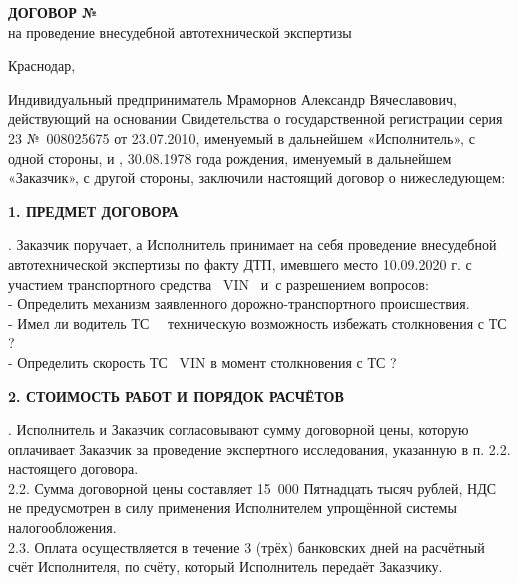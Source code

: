 \begin{center}
    	\textbf{{\large  ДОГОВОР № \NomerDoc}}\\
    	 на проведение внесудебной автотехнической экспертизы 
    	 \vspace{-3mm}
    \end{center}
\vspace{-6mm}
\begin{flushright}
		\hfill	Краснодар, \dog    \\[8mm]
\end{flushright} 
\vspace{-6mm}
Индивидуальный предприниматель Мраморнов Александр Вячеславович, действующий на основании Свидетельства о государственной регистрации серия 23 №~008025675 от 23.07.2010, именуемый в дальнейшем «Исполнитель», с одной стороны, и , 30.08.1978 года рождения, именуемый в дальнейшем «Заказчик», с другой стороны, заключили настоящий договор о нижеследующем:

         
\begin{center}
	\textbf{1. ПРЕДМЕТ ДОГОВОРА}
\end{center}
\vspace{-3mm}
 . Заказчик поручает, а Исполнитель принимает на себя проведение внесудебной автотехнической экспертизы по факту ДТП, имевшего место 10.09.2020 г. с участием  транспортного средства  \, VIN \vin\, и  \,с разрешением вопросов:\\
 - Определить механизм заявленного дорожно-транспортного происшествия.\\
 - Имел ли водитель ТС \,   \, техническую возможность избежать столкновения с ТС ?\\ 
- Определить скорость ТС  \, VIN \vin в момент столкновения с ТС ?


\begin{center}
	\textbf{2. СТОИМОСТЬ РАБОТ И ПОРЯДОК РАСЧЁТОВ}
\end{center}
\vspace{-3mm}
 . Исполнитель и Заказчик согласовывают сумму договорной цены, которую оплачивает Заказчик   за проведение экспертного исследования, указанную в п. 2.2. настоящего договора.\\ 
2.2. Сумма договорной цены составляет  15~000 {Пятнадцать тысяч} рублей, НДС не предусмотрен в силу применения Исполнителем упрощённой системы налогообложения.\\
2.3. Оплата осуществляется в течение 3 (трёх) банковских дней на расчётный счёт Исполнителя, по счёту, который Исполнитель передаёт Заказчику.

